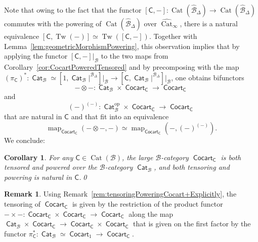 \documentclass[reqno]{amsart}
\numberwithin{equation}{subsection}
\theoremstyle{plain}
\newtheorem{corollary}[equation]{Corollary}
\theoremstyle{definition}
\newtheorem{remark}[equation]{Remark}
\let\scr=\mathcal
\def\BB{\scr B}
\def\BBB{\widehat{\BB}}
\DeclareMathOperator{\Cat}{Cat}
\DeclareMathOperator{\ICat}{\mathsf{Cat}}
\DeclareMathOperator{\ICocart}{\mathsf{Cocart}}
\DeclareMathOperator{\Tw}{Tw}
\DeclareMathOperator{\Map}{map}
\newcommand{\op}{\mathrm{op}}
\newcommand{\map}[1]{\Map_{#1}}
\newcommand{\I}[1]{\mathsf{#1}}
\newcommand{\iFun}[2]{{[#1,#2]}}
\newcommand{\Simp}[1]{#1_{\Delta}}
\newcommand{\CatSS}{\widehat{\Cat}_\infty}
\begin{document}
Note that owing to the fact that the functor $\iFun{\I{C}}{-}\colon \Cat(\Simp\BBB)\to\Cat(\Simp\BBB)$  commutes with the powering of $\Cat(\Simp\BBB)$ over $\CatSS$, there is a natural equivalence $\iFun{\I{C}}{\Tw(-)}\simeq \Tw(\iFun{\I{C}}{-})$. Together with Lemma~\ref{lem:geometricMorphismPowering}, this observation implies that by applying the functor $\iFun{\I{C}}{-}\vert_{\BB}$ to the two maps from Corollary~\ref{cor:CocartPoweredTensored} and by precomposing with the map $(\pi_{\I{C}})^\ast\colon \ICat_{\BB}\simeq\iFun{1}{\ICat_{\BB}\vert^{\Simp\BB}}\vert_{\BB}\to\iFun{\I{C}}{\ICat_{\BB}\vert^{\Simp\BB}}\vert_{\BB}$, one obtains bifunctors
	\begin{equation*}
	-\otimes -\colon \ICat_{\BB}\times \ICocart_{\I{C}}\to\ICocart_{\I{C}}
	\end{equation*}
	and
	\begin{equation*}
	(-)^{(-)}\colon\ICat_{\BB}^{\op}\times\ICocart_{\I{C}}\to\ICocart_{\I{C}}
	\end{equation*}
	that are natural in $\I{C}$ and that fit into an equivalence
	\begin{equation*}
	\map{\ICocart_{\I{C}}}(-\otimes -,-)\simeq\map{\ICocart_{\I{C}}}(-, (-)^{(-)}).
	\end{equation*}
	We conclude:
\begin{corollary}
	\label{cor:CocartCTensoredPowered}
	For any $\I{C}\in\Cat(\BB)$, the large $\BB$-category $\ICocart_{\I{C}}$ is both tensored and powered over the $\BB$-category $\ICat_{\BB}$, and both tensoring and powering is natural in $\I{C}$.\qed
\end{corollary}

\begin{remark}
	\label{rem:CocartCTensoringPoweringExplicitly}
	Using Remark~\ref{rem:tensoringPoweringCocart+Explicitly}, the tensoring of $\ICocart_{\I{C}}$ is given by the restriction of the product functor $-\times-\colon\ICocart_{\I{C}}\times\ICocart_{\I{C}}\to\ICocart_{\I{C}}$ along the map $\ICat_{\BB}\times\ICocart_{\I{C}}\to\ICocart_{\I{C}}\times\ICocart_{\I{C}}$ that is given on the first factor by the functor $\pi_{\I{C}}^\ast\colon \ICat_{\BB}\simeq\ICocart_{1}\to\ICocart_{\I{C}}$.
\end{remark}
\end{document}
